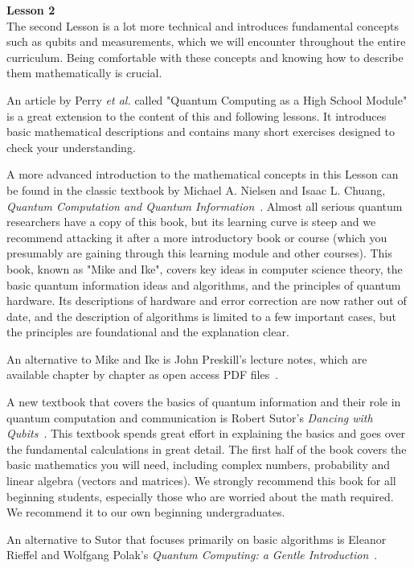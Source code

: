 {\bf Lesson 2}\\

The second Lesson is a lot more technical and introduces fundamental concepts such as qubits and measurements, which we will encounter throughout the entire curriculum. Being comfortable with these concepts and knowing how to describe them mathematically is crucial.

An article by Perry \emph{et al.} called "Quantum Computing as a High School Module" is a great extension to the content of this and following lessons. It introduces basic mathematical descriptions and contains many short exercises designed to check your understanding.

A more advanced introduction to the mathematical concepts in this Lesson can be found in the classic textbook by Michael A. Nielsen and Isaac L. Chuang, \emph{Quantum Computation and Quantum Information}~\cite{nielsen-chuang:qci}. Almost all serious quantum researchers have a copy of this book, but its learning curve is steep and we recommend attacking it after a more introductory book or course (which you presumably are gaining through this learning module and other courses). This book, known as "Mike and Ike", covers key ideas in computer science theory, the basic quantum information ideas and algorithms, and the principles of quantum hardware. Its descriptions of hardware and error correction are now rather out of date, and the description of algorithms is limited to a few important cases, but the principles are foundational and the explanation clear.

An alternative to Mike and Ike is John Preskill's lecture notes, which are available chapter by chapter as open access PDF files~\cite{preskill:PH-CS219}.

A new textbook that covers the basics of quantum information and their role in quantum computation and communication is Robert Sutor's \emph{Dancing with Qubits}~\cite{sutor19:dancing}. This textbook spends great effort in explaining the basics and goes over the fundamental calculations in great detail. The first half of the book covers the basic mathematics you will need, including complex numbers, probability and linear algebra (vectors and matrices). We strongly recommend this book for all beginning students, especially those who are worried about the math required. We recommend it to our own beginning undergraduates.

An alternative to Sutor that focuses primarily on basic algorithms is Eleanor Rieffel and Wolfgang Polak's \emph{Quantum Computing: a Gentle Introduction}~\cite{rieffel2011quantum}.


